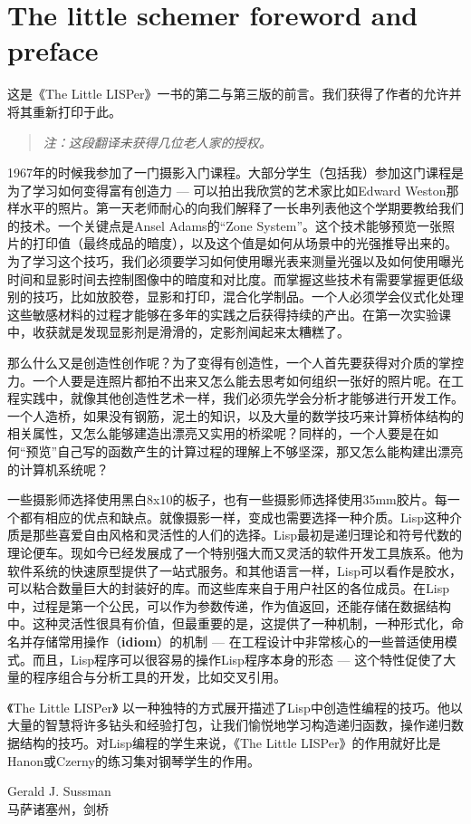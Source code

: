 \section*{The little schemer\cite{friedman96little} foreword and preface}

这是《The Little LISPer》一书的第二与第三版的前言。我们获得了作者的允许并将其重新打印于此。

\begin{quote}
\itshape
注：这段翻译未获得几位老人家的授权。
\end{quote}

1967年的时候我参加了一门摄影入门课程。大部分学生（包括我）参加这门课程是为了学习如何变得富有创造力 --- 可以拍出我欣赏的艺术家比如Edward Weston那样水平的照片。第一天老师耐心的向我们解释了一长串列表他这个学期要教给我们的技术。一个关键点是Ansel Adams的``Zone System''。这个技术能够预览一张照片的打印值（最终成品的暗度），以及这个值是如何从场景中的光强推导出来的。为了学习这个技巧，我们必须要学习如何使用曝光表来测量光强以及如何使用曝光时间和显影时间去控制图像中的暗度和对比度。而掌握这些技术有需要掌握更低级别的技巧，比如放胶卷，显影和打印，混合化学制品。一个人必须学会仪式化处理这些敏感材料的过程才能够在多年的实践之后获得持续的产出。在第一次实验课中，收获就是发现显影剂是滑滑的，定影剂闻起来太糟糕了。

那么什么又是创造性创作呢？为了变得有创造性，一个人首先要获得对介质的掌控力。一个人要是连照片都拍不出来又怎么能去思考如何组织一张好的照片呢。在工程实践中，就像其他创造性艺术一样，我们必须先学会分析才能够进行开发工作。一个人造桥，如果没有钢筋，泥土的知识，以及大量的数学技巧来计算桥体结构的相关属性，又怎么能够建造出漂亮又实用的桥梁呢？同样的，一个人要是在如何``预览''自己写的函数产生的计算过程的理解上不够坚深，那又怎么能构建出漂亮的计算机系统呢？

一些摄影师选择使用黑白8x10的板子，也有一些摄影师选择使用35mm胶片。每一个都有相应的优点和缺点。就像摄影一样，变成也需要选择一种介质。Lisp这种介质是那些喜爱自由风格和灵活性的人们的选择。Lisp最初是递归理论和符号代数的理论便车。现如今已经发展成了一个特别强大而又灵活的软件开发工具族系。他为软件系统的快速原型提供了一站式服务。和其他语言一样，Lisp可以看作是胶水，可以粘合数量巨大的封装好的库。而这些库来自于用户社区的各位成员。在Lisp中，过程是第一个公民，可以作为参数传递，作为值返回，还能存储在数据结构中。这种灵活性很具有价值，但最重要的是，这提供了一种机制，一种形式化，命名并存储常用操作（\textbf{idiom}）的机制 --- 在工程设计中非常核心的一些普适使用模式。而且，Lisp程序可以很容易的操作Lisp程序本身的形态 --- 这个特性促使了大量的程序组合与分析工具的开发，比如交叉引用。

《The Little LISPer》 以一种独特的方式展开描述了Lisp中创造性编程的技巧。他以大量的智慧将许多钻头和经验打包，让我们愉悦地学习构造递归函数，操作递归数据结构的技巧。对Lisp编程的学生来说，《The Little LISPer》的作用就好比是Hanon或Czerny的练习集对钢琴学生的作用。

{
\vspace{30pt}
\begin{flushright}
Gerald J. Sussman\\
马萨诸塞州，剑桥
\end{flushright}
}
